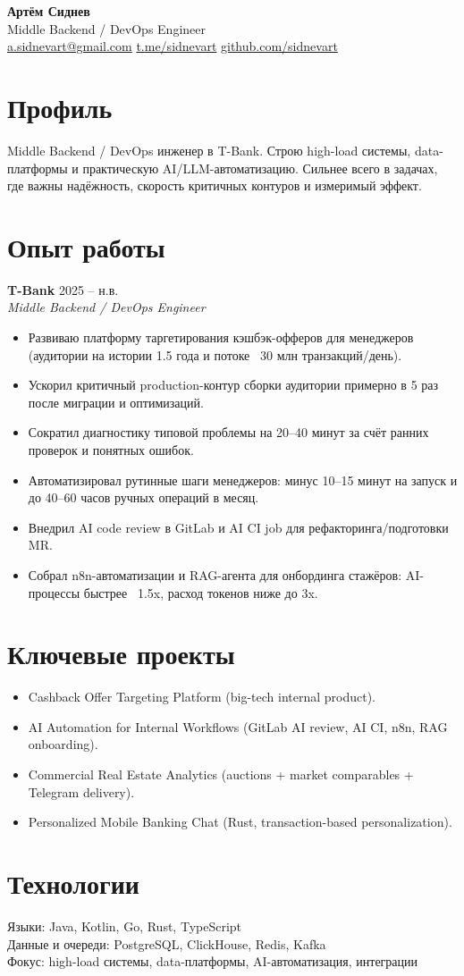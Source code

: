 \documentclass[10pt,a4paper]{article}
\begin{document}
\begin{center}
{\LARGE \textbf{Артём Сиднев}}\\[0.35em]
Middle Backend / DevOps Engineer\\[0.35em]
\href{mailto:a.sidnevart@gmail.com}{a.sidnevart@gmail.com} \quad
\href{https://t.me/sidnevart}{t.me/sidnevart} \quad
\href{https://github.com/sidnevart}{github.com/sidnevart}
\end{center}

\vspace{0.6em}

\section*{Профиль}
Middle Backend / DevOps инженер в T-Bank. Строю high-load системы, data-платформы и практическую AI/LLM-автоматизацию. Сильнее всего в задачах, где важны надёжность, скорость критичных контуров и измеримый эффект.

\section*{Опыт работы}
\textbf{T-Bank} \hfill 2025 -- н.в.\\
\textit{Middle Backend / DevOps Engineer}
\begin{itemize}
  \item Развиваю платформу таргетирования кэшбэк-офферов для менеджеров (аудитории на истории 1.5 года и потоке ~30 млн транзакций/день).
  \item Ускорил критичный production-контур сборки аудитории примерно в 5 раз после миграции и оптимизаций.
  \item Сократил диагностику типовой проблемы на 20--40 минут за счёт ранних проверок и понятных ошибок.
  \item Автоматизировал рутинные шаги менеджеров: минус 10--15 минут на запуск и до 40--60 часов ручных операций в месяц.
  \item Внедрил AI code review в GitLab и AI CI job для рефакторинга/подготовки MR.
  \item Собрал n8n-автоматизации и RAG-агента для онбординга стажёров: AI-процессы быстрее ~1.5x, расход токенов ниже до 3x.
\end{itemize}

\section*{Ключевые проекты}
\begin{itemize}
  \item Cashback Offer Targeting Platform (big-tech internal product).
  \item AI Automation for Internal Workflows (GitLab AI review, AI CI, n8n, RAG onboarding).
  \item Commercial Real Estate Analytics (auctions + market comparables + Telegram delivery).
  \item Personalized Mobile Banking Chat (Rust, transaction-based personalization).
\end{itemize}

\section*{Технологии}
Языки: Java, Kotlin, Go, Rust, TypeScript\\
Данные и очереди: PostgreSQL, ClickHouse, Redis, Kafka\\
Фокус: high-load системы, data-платформы, AI-автоматизация, интеграции
\end{document}
